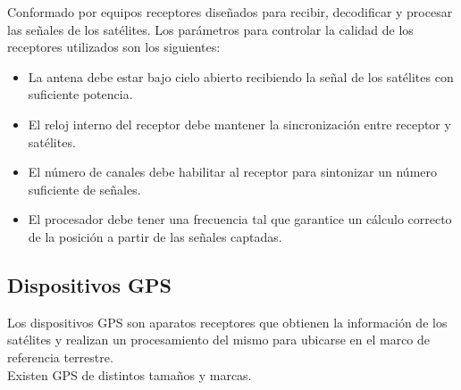 Conformado por equipos receptores diseñados para recibir, decodificar y procesar las señales de los satélites. Los parámetros para controlar la calidad de los receptores utilizados son los siguientes:

\begin{itemize}
	\item La antena debe estar bajo cielo abierto recibiendo la señal de los satélites con suficiente potencia.
	\item El reloj interno del receptor debe mantener la sincronización entre receptor y satélites.
	\item El número de canales debe habilitar al receptor para sintonizar un número suficiente de señales.
	\item El procesador debe tener una frecuencia tal que garantice un cálculo correcto de la posición a partir de las señales captadas.	
\end{itemize}

\cite{termal2014prototipo}

\subsection{Dispositivos GPS}
Los dispositivos GPS son aparatos receptores que obtienen la información de los satélites y realizan un procesamiento del mismo para ubicarse en el marco de referencia terrestre. \\

\newpage
Existen GPS de distintos tamaños y marcas.


